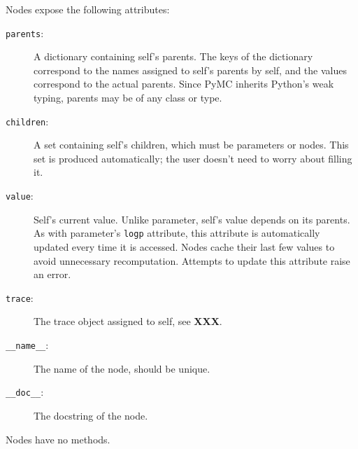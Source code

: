 \documentclass[]{book}
\begin{document}
Nodes expose the following attributes:
\begin{description}
    \item[\texttt{parents}:] A dictionary containing self's parents. The keys of the dictionary correspond to the names assigned to self's parents by self, and the values correspond to the actual parents. Since PyMC inherits Python's weak typing, parents may be of any class or type.
    \item[\texttt{children}:] A set containing self's children, which must be parameters or nodes. This set is produced automatically; the user doesn't need to worry about filling it.
    \item[\texttt{value}:] Self's current value. Unlike parameter, self's value depends on its parents. As with parameter's \texttt{logp} attribute, this attribute is automatically updated every time it is accessed. Nodes cache their last few values to avoid unnecessary recomputation. Attempts to update this attribute raise an error.
    \item[\texttt{trace}:] The trace object assigned to self, see \textbf{XXX}.
    \item[\texttt{\_\_name\_\_}:] The name of the node, should be unique.
    \item[\texttt{\_\_doc\_\_}:] The docstring of the node.
\end{description}
Nodes have no methods.
\end{document}
